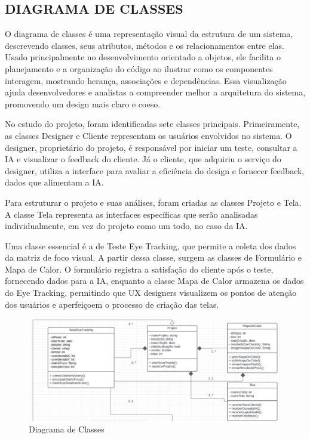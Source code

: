 \subsection*{DIAGRAMA DE CLASSES}
O diagrama de classes é uma representação visual da estrutura de um sistema, descrevendo classes, seus atributos, métodos e os relacionamentos entre elas. Usado principalmente no desenvolvimento orientado a objetos, ele facilita o planejamento e a organização do código ao ilustrar como os componentes interagem, mostrando herança, associações e dependências. Essa visualização ajuda desenvolvedores e analistas a compreender melhor a arquitetura do sistema, promovendo um design mais claro e coeso. \textcite{Lucidchart}

No estudo do projeto, foram identificadas sete classes principais. Primeiramente, as classes Designer e Cliente representam os usuários envolvidos no sistema. O designer, proprietário do projeto, é responsável por iniciar um teste, consultar a IA e visualizar o feedback do cliente. Já o cliente, que adquiriu o serviço do designer, utiliza a interface para avaliar a eficiência do design e fornecer feedback, dados que alimentam a IA.

Para estruturar o projeto e suas análises, foram criadas as classes Projeto e Tela. A classe Tela representa as interfaces específicas que serão analisadas individualmente, em vez do projeto como um todo, no caso da IA.

Uma classe essencial é a de Teste Eye Tracking, que permite a coleta dos dados da matriz de foco visual. A partir dessa classe, surgem as classes de Formulário e Mapa de Calor. O formulário registra a satisfação do cliente após o teste, fornecendo dados para a IA, enquanto a classe Mapa de Calor armazena os dados do Eye Tracking, permitindo que UX designers visualizem os pontos de atenção dos usuários e aperfeiçoem o processo de criação das telas.\newline

\begin{figure}[H]
    \centering
    \caption{Diagrama de Classes}%
    \label{fig:pg-classes}
    \includegraphics[width=0.72\linewidth]{Illustrations/classes1.png}
\end{figure}

